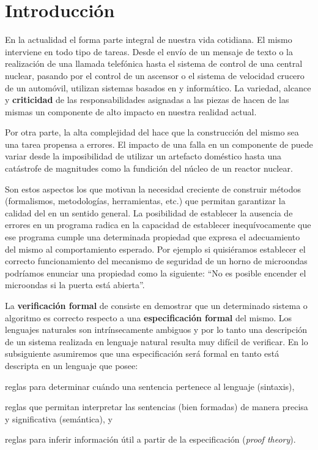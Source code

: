 \chapter{Introducción}
\label{intro}

En la actualidad el \soft forma parte integral de nuestra vida cotidiana. El
mismo interviene en todo tipo de tareas. Desde el envío de un mensaje de texto
o la realización de una llamada telefónica hasta el sistema de control de una
central nuclear, pasando por el control de un ascensor o el sistema de
velocidad crucero de un automóvil, utilizan sistemas basados en \hard y \soft
informático. La variedad, alcance y \textbf{criticidad} de las
responsabilidades asignadas a las piezas de \soft hacen de las mismas un
componente de alto impacto en nuestra realidad actual.

Por otra parte, la alta complejidad del \soft hace que la construcción del
mismo sea una tarea propensa a errores. El impacto de una falla en un
componente de \soft puede variar desde la imposibilidad de utilizar un
artefacto doméstico hasta una catástrofe de magnitudes como la fundición del
núcleo de un reactor nuclear.

Son estos aspectos los que motivan la necesidad creciente de construir métodos
(formalismos, metodologías, herramientas, etc.) que permitan garantizar la
calidad del \soft en un sentido general. La posibilidad de establecer la
ausencia de errores en un programa radica en la capacidad de establecer
inequívocamente que ese programa cumple una determinada propiedad que expresa
el adecuamiento del mismo al comportamiento esperado. Por ejemplo si
quisiéramos establecer el correcto  funcionamiento del mecanismo de seguridad
de un horno de microondas podríamos enunciar una propiedad como la siguiente:
``No es posible encender el microondas si la puerta está abierta''.

La \textbf{verificación formal} de \soft consiste en demostrar que un
determinado sistema o algoritmo es correcto respecto a una
\textbf{especificación formal} del mismo. Los lenguajes naturales son
intrínsecamente ambiguos y por lo tanto una descripción de un sistema
realizada en lenguaje natural resulta muy difícil de verificar. En lo subsiguiente asumiremos que una especificación
será formal en tanto está descripta en un lenguaje que posee: 
\begin{inparaenum}[a)] 
\item reglas para determinar cuándo una sentencia pertenece al lenguaje (sintaxis), 
\item reglas que permitan interpretar las sentencias (bien formadas) de manera precisa y
significativa (semántica), y 
\item reglas para inferir información útil a partir de la especificación (\emph{proof theory}). 
\end{inparaenum}

